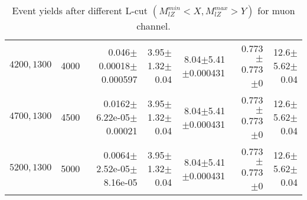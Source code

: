 \documentclass[]{article}
\begin{document}
\begin{table}
\begin{center}
{\begin{tabular}{ |r|r|r|r|r|r|r|}
$4200,1300$ & 4000 & 0.046$\pm$0.00018$\pm$0.000597 & 3.95$\pm$1.32$\pm$0.04 & 8.04$\pm$5.41$\pm$0.000431 & 0.773$\pm$0.773$\pm$0 & 12.6$\pm$5.62$\pm$0.04 \\
$4700,1300$ & 4500 & 0.0162$\pm$6.22e-05$\pm$0.00021 & 3.95$\pm$1.32$\pm$0.04 & 8.04$\pm$5.41$\pm$0.000431 & 0.773$\pm$0.773$\pm$0 & 12.6$\pm$5.62$\pm$0.04 \\
$5200,1300$ & 5000 & 0.0064$\pm$2.52e-05$\pm$8.16e-05 & 3.95$\pm$1.32$\pm$0.04 & 8.04$\pm$5.41$\pm$0.000431 & 0.773$\pm$0.773$\pm$0 & 12.6$\pm$5.62$\pm$0.04 \\
\hline 
\end{tabular}
}
\end{center}
\caption{Event yields after different L-cut $(M_{lZ}^{min} < X, M_{lZ}^{max} > Y)$ for muon channel.}
\end{table}
\end{document}
